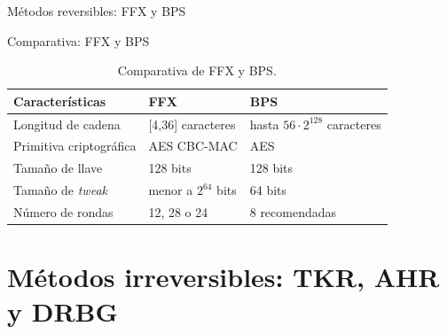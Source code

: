 \documentclass{beamer}
\begin{document}
\begin{frame}{Métodos reversibles: FFX y BPS}
\begin{figure}
    \end{figure}
  \end{frame}

  \begin{frame}{Comparativa: FFX y BPS}

    \begin{table}
      \begin{tabular}{|m{}|m{}|m{}|}
        \hline
        \textbf{Características} & \textbf{FFX} & \textbf{BPS}
        \\\hline
        Longitud de cadena & [4,36] caracteres & hasta $56 \cdot 2^{128}$ caracteres
        \\\hline
        Primitiva criptográfica & AES CBC-MAC & AES
        \\\hline
        Tamaño de llave & 128 bits & 128 bits
        \\\hline
        Tamaño de \textit{tweak} & menor a $2^{64}$ bits & 64 bits
        \\\hline
        Número de rondas & 12, 28 o 24 & 8 recomendadas
        \\\hline
      \end{tabular}
      \caption{Comparativa de FFX y BPS.}
    \end{table}

  \end{frame}

  \section{Métodos irreversibles: TKR, AHR y DRBG}
\end{document}
